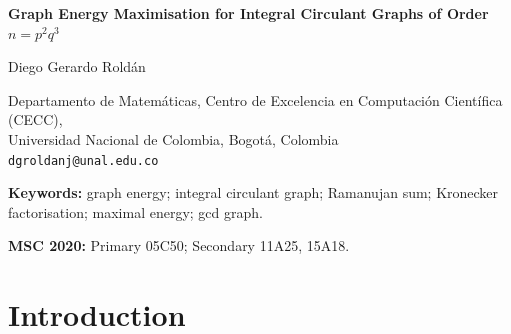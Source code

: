 \documentclass[12pt,a4paper]{article}
\theoremstyle{plain}
\theoremstyle{definition}
\newcommand{\ICG}{\mathrm{ICG}}
\newcommand{\Dstar}{\mathcal{D}^*}
\begin{document}
\begin{center}
  {\LARGE\bfseries
   Graph Energy Maximisation for Integral Circulant
   Graphs of Order $n = p^2q^3$}

  \bigskip
  {\large Diego Gerardo Rold\'{a}n}

  \medskip
  {\normalsize
   Departamento de Matem\'{a}ticas,
   Centro de Excelencia en Computaci\'{o}n Cient\'{i}fica (CECC),\\
   Universidad Nacional de Colombia, Bogot\'{a}, Colombia\\
   \texttt{dgroldanj@unal.edu.co}}
\end{center}

\bigskip

\begin{abstract}
\noindent
The energy of a graph is the sum of the absolute values of its adjacency
eigenvalues.  For integral circulant graphs $\ICG(n,\mathcal{D})$ of
order $n=p^2q^3$, where $p$ and $q$ are distinct odd primes, we prove
that the adjacency eigenvalues of $\ICG(p^2q^3,\Dstar)$, for the divisor
set $\Dstar=\{1,p^2,pq,q^2,p^2q^2,pq^3\}$, admit an exact Kronecker
factorisation in the prime exponents: they separate completely into a
factor depending only on $p$ and a factor depending only on~$q$.  This
factorisation holds unconditionally for all pairs of distinct odd primes
and constitutes the structural core of the paper.  From it we derive,
unconditionally, the first closed-form polynomial formula for the energy
of a two-prime-order integral circulant graph evaluated at $\Dstar$.
Exhaustive computation over  prime pairs $(p,q)$  
confirms that $\Dstar$ is the unique energy maximiser in every tested
case; we conjecture that this universality holds for all pairs of distinct
odd primes. 
\end{abstract}

\medskip
\noindent\textbf{Keywords:} graph energy; integral circulant graph;
Ramanujan sum; Kronecker factorisation; maximal energy; gcd graph.

\medskip
\noindent\textbf{MSC 2020:} Primary 05C50; Secondary 11A25, 15A18.

\bigskip

\section{Introduction}
\label{sec:intro}
\end{document}
